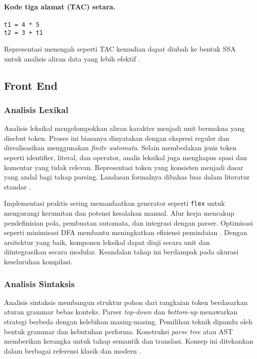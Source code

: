 \documentclass[../main.tex]{subfiles}
\begin{document}
\paragraph{Kode tiga alamat (TAC) setara.}
\begin{verbatim}
t1 = 4 * 5
t2 = 3 + t1
\end{verbatim}

Representasi menengah seperti TAC kemudian dapat diubah ke bentuk SSA untuk analisis aliran data yang lebih efektif \citep{WikiSSA}.
\subsection{Front End}
\subsubsection{Analisis Lexikal}
Analisis leksikal mengelompokkan aliran karakter menjadi unit bermakna yang disebut token. Proses ini biasanya dinyatakan dengan ekspresi reguler dan direalisasikan menggunakan \emph{finite automata}. Selain membedakan jenis token seperti identifier, literal, dan operator, analis leksikal juga menghapus spasi dan komentar yang tidak relevan. Representasi token yang konsisten menjadi dasar yang andal bagi tahap parsing. Landasan formalnya dibahas luas dalam literatur standar \citep{WikiRegex,WikiDFA,WikiNFA}.

Implementasi praktis sering memanfaatkan generator seperti \texttt{flex} untuk mengurangi kerumitan dan potensi kesalahan manual. Alur kerja mencakup pendefinisian pola, pembuatan automata, dan integrasi dengan parser. Optimisasi seperti minimisasi DFA membantu meningkatkan efisiensi pemindaian \citep{WikiDFAMin}. Dengan arsitektur yang baik, komponen leksikal dapat diuji secara unit dan diintegrasikan secara modular. Keandalan tahap ini berdampak pada akurasi keseluruhan kompilasi.

\subsubsection{Analisis Sintaksis}
Analisis sintaksis membangun struktur pohon dari rangkaian token berdasarkan aturan grammar bebas konteks. Parser \emph{top-down} dan \emph{bottom-up} menawarkan strategi berbeda dengan kelebihan masing-masing. Pemilihan teknik dipandu oleh bentuk grammar dan kebutuhan performa. Konstruksi \emph{parse tree} atau AST memberikan kerangka untuk tahap semantik dan translasi. Konsep ini ditekankan dalam berbagai referensi klasik dan modern \citep{Mogensen2010,Wirth1996,WikiLL,WikiLR}.
\end{document}
